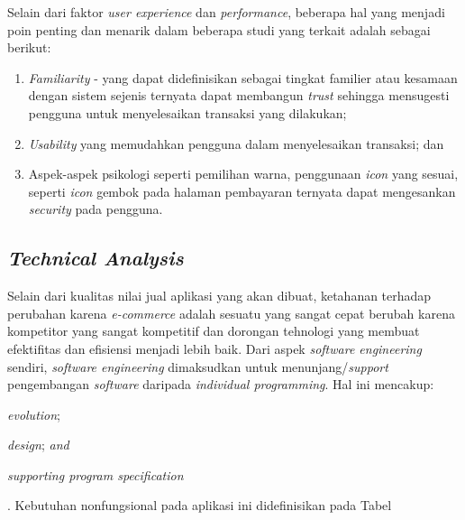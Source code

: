 Selain dari faktor \textit{user experience} dan \textit{performance}, beberapa hal yang menjadi poin penting dan menarik dalam beberapa studi yang terkait adalah sebagai berikut:
\begin{enumerate}[label=\alph*.]
	\item \textit{Familiarity} - yang dapat didefinisikan sebagai tingkat familier atau kesamaan dengan sistem sejenis ternyata dapat membangun \textit{trust} sehingga mensugesti pengguna untuk menyelesaikan transaksi yang dilakukan\cite{geven_e-commerce};
	\item \textit{Usability} yang memudahkan pengguna dalam menyelesaikan transaksi; dan
	\item Aspek-aspek psikologi seperti pemilihan warna, penggunaan \textit{icon} yang sesuai, seperti \textit{icon} gembok pada halaman pembayaran ternyata dapat mengesankan \textit{security} pada pengguna\cite{ewer_psychology_2014}\cite{coffin_color_2013}.
\end{enumerate}

\subsection{\textit{Technical Analysis}}
 Selain dari kualitas nilai jual aplikasi yang akan dibuat, ketahanan terhadap perubahan karena \textit{e-commerce} adalah sesuatu yang sangat cepat berubah karena kompetitor yang sangat kompetitif dan dorongan tehnologi yang membuat efektifitas dan efisiensi menjadi lebih baik.
Dari aspek \textit{software engineering} sendiri, \textit{software engineering} dimaksudkan untuk menunjang/\textit{support} pengembangan \textit{software} daripada \textit{individual programming}. Hal ini mencakup: \begin{inlinelist}
	\item \textit{evolution};
	\item \textit{design}; \textit{and}
	\item \textit{supporting program specification}
\end{inlinelist}\cite{software-engineering}.
Kebutuhan nonfungsional pada aplikasi ini didefinisikan pada Tabel 

